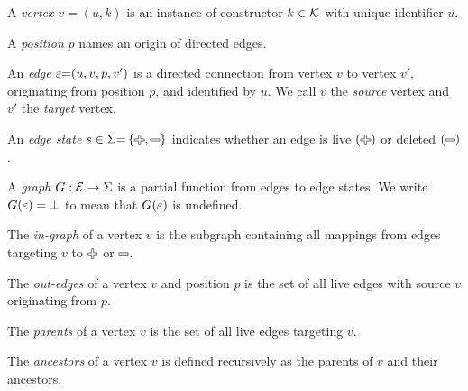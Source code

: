 \begin{definition}
  A \emph{vertex} $v{=}(u, k)$ is an instance of constructor $k \in \mathcal{K}$ with unique identifier $u$.
\end{definition}

\begin{definition}
  A \emph{position} $p$ names an origin of directed edges.
\end{definition}

\begin{definition}
  An \emph{edge} $\varepsilon{=}(u, v, p, v^\prime)$ is a directed connection from vertex $v$ to vertex $v'$, originating from position $p$, and identified by $u$.
  We call $v$ the \emph{source} vertex and $v'$ the \emph{target} vertex.
\end{definition}

\begin{definition}
  An \emph{edge state} $s \in \Sigma{=}\SetOf{\Plus, \Minus}$ indicates whether an edge is live $\left(\Plus\right)$ or deleted $\left(\Minus\right)$.
\end{definition}

\begin{definition}
  A \emph{graph} $G : \mathcal{E} \rightarrow \Sigma$ is a partial function from edges to edge states.
  We write $G(\varepsilon) = \bot$ to mean that $G(\varepsilon)$ is undefined.
\end{definition}

\begin{definition}
  The \emph{in-graph} of a vertex $v$ is the subgraph containing all mappings from edges targeting $v$ to $\Plus$ or $\Minus$.
\end{definition}

\begin{definition}
  The \emph{out-edges} of a vertex $v$ and position $p$ is the set of all live edges with source $v$ originating from $p$.
\end{definition}

\begin{definition}
  The \emph{parents} of a vertex $v$ is the set of all live edges targeting $v$.
\end{definition}

\begin{definition}
  The \emph{ancestors} of a vertex $v$ is defined recursively as the parents of $v$ and their ancestors.
\end{definition}


